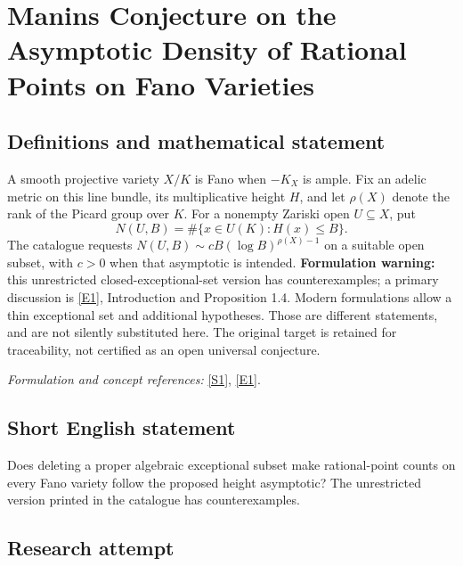 \documentclass[11pt,a4paper]{article}
\newcommand{\sref}[2]{\hyperlink{source:#1:#2}{[S#2]}}
\newcommand{\eref}[2]{\hyperlink{extra:#1:#2}{[E#2]}}
\newif\ifshowcatalogue
\newcommand{\cataloguescope}[1]{\ifshowcatalogue
 \paragraph{Exact scope in the supplied catalogue.}
 \begin{quote}\small #1\end{quote}\fi}
\numberwithin{equation}{section}
\begin{document}
\setcounter{section}{0}
\clearpage
\section*{\texorpdfstring{Manins Conjecture on the Asymptotic Density of Rational Points on Fano Varieties}{Manins Conjecture on the Asymptotic Density of Rational Points on Fano Varieties}}\label{statement}
\subsection{Definitions and mathematical statement}
A smooth projective variety $X/K$ is Fano when $-K_X$ is ample. Fix an adelic metric on this line bundle, its multiplicative height $H$, and let $\rho(X)$ denote the rank of the Picard group over $K$. For a nonempty Zariski open $U\subseteq X$, put
\[
 N(U,B)=\#\{x\in U(K):H(x)\le B\}.
\]
The catalogue requests $N(U,B)\sim cB(\log B)^{\rho(X)-1}$ on a suitable open subset, with $c>0$ when that asymptotic is intended. \textbf{Formulation warning:} this unrestricted closed-exceptional-set version has counterexamples; a primary discussion is \eref{statement}{1}, Introduction and Proposition 1.4. Modern formulations allow a thin exceptional set and additional hypotheses. Those are different statements, and are not silently substituted here. The original target is retained for traceability, not certified as an open universal conjecture.
\par\smallskip\textit{Formulation and concept references:} \sref{statement}{1}, \eref{statement}{1}.
\cataloguescope{Prove that for any smooth Fano variety X over a number field K with ample anticanonical bundle, the number of rational points of anticanonical height <= B on a Zariski open subset satisfies N(U, B) \textasciitilde{} c B (log B)\textasciicircum{}\{rho(X)-1\}.}
\subsection{Short English statement}
Does deleting a proper algebraic exceptional subset make rational-point counts on every Fano variety follow the proposed height asymptotic? The unrestricted version printed in the catalogue has counterexamples.
\subsection{Research attempt}
\end{document}
